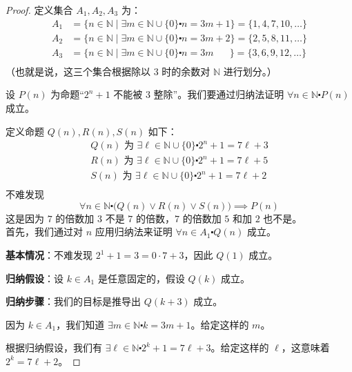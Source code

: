 \begin{proof}
    定义集合 $A_1, A_2, A_3$ 为：
    \begin{align*}
        A_1 &= \{n \in \mathbb{N} \mid \exists m \in \mathbb{N} \cup \{0\} \centerdot n = 3m + 1\} = \{1, 4, 7, 10, \dots \} \\
        A_2 &= \{n \in \mathbb{N} \mid \exists m \in \mathbb{N} \cup \{0\} \centerdot n = 3m + 2\} = \{2, 5, 8, 11, \dots \} \\
        A_3 &= \{n \in \mathbb{N} \mid \exists m \in \mathbb{N} \cup \{0\} \centerdot n = 3m \quad\:\:\:\} = \{3, 6, 9, 12, \dots \} \\
    \end{align*}
    （也就是说，这三个集合根据除以 $3$ 时的余数对 $\mathbb{N}$ 进行划分。）

    设 $P(n)$ 为命题``$2^n+1$ 不能被 $3$ 整除''。我们要通过归纳法证明 $\forall n \in \mathbb{N} \centerdot P(n)$ 成立。

    定义命题 $Q(n), R(n), S(n)$ 如下：
    \begin{align*}
        Q(n) \text{ 为 } \exists \ell \in \mathbb{N} \cup \{0\} \centerdot 2^n + 1 = 7\ell + 3 \\
        R(n) \text{ 为 } \exists \ell \in \mathbb{N} \cup \{0\} \centerdot 2^n + 1 = 7\ell + 5 \\
        S(n) \text{ 为 } \exists \ell \in \mathbb{N} \cup \{0\} \centerdot 2^n + 1 = 7\ell + 2 \\
    \end{align*}
    不难发现
    \[\forall n \in \mathbb{N} \centerdot \big(Q(n) \lor R(n) \lor S(n)\big) \implies P(n)\]
    这是因为 $7$ 的倍数加 $3$ 不是 $7$ 的倍数，$7$ 的倍数加 $5$ 和加 $2$ 也不是。\\
    
    首先，我们通过对 $n$ 应用归纳法来证明 $\forall n \in A_1 \centerdot Q(n)$ 成立。

    \textbf{基本情况}：不难发现 $2^1+1=3 = 0 \cdot 7 + 3$，因此 $Q(1)$ 成立。

    \textbf{归纳假设}：设 $k \in A_1$ 是任意固定的，假设 $Q(k)$ 成立。

    \textbf{归纳步骤}：我们的目标是推导出 $Q(k+3)$ 成立。

    因为 $k \in A_1$，我们知道 $\exists m \in \mathbb{N} \centerdot k = 3m + 1$。给定这样的 $m$。

    根据归纳假设，我们有 $\exists \ell \in \mathbb{N} \centerdot 2^k + 1 = 7\ell + 3$。给定这样的 $\ell$，这意味着 $2^k = 7\ell + 2$。


\end{proof}
